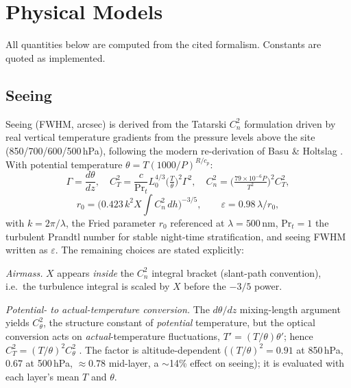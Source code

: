 \documentclass[11pt]{article}
\begin{document}
\section{Physical Models}

All quantities below are computed from the cited formalism. Constants are quoted
as implemented.

\subsection{Seeing}
\label{sec:seeing}
Seeing (FWHM, arcsec) is derived from the Tatarski $C_n^2$ formulation
\cite{tatarski} driven by real vertical temperature gradients from the pressure
levels above the site (850/700/600/500\,hPa), following the modern re-derivation of
Basu \& Holtslag \cite{basu}. With potential temperature $\theta = T(1000/P)^{R/c_p}$:
\[
\Gamma = \frac{d\theta}{dz},\quad
C_T^2 = \frac{c}{\mathrm{Pr}_t}L_0^{4/3}\Big(\tfrac{T}{\theta}\Big)^{2}\Gamma^2,\quad
C_n^2 = \Big(\tfrac{79\times10^{-6}P}{T^2}\Big)^{2}C_T^2,
\]
\[
r_0 = \big(0.423\,k^2 X\!\int\! C_n^2\,dh\big)^{-3/5},\qquad
\varepsilon = 0.98\,\lambda/r_0,
\]
with $k=2\pi/\lambda$, the Fried parameter $r_0$ \cite{fried} referenced at
$\lambda=500$\,nm, $\mathrm{Pr}_t=1$ the turbulent Prandtl number for stable
night-time stratification, and seeing FWHM written as $\varepsilon$. The remaining
choices are stated explicitly:

\emph{Airmass.} $X$ appears \emph{inside} the $C_n^2$ integral bracket (slant-path
convention), i.e.\ the turbulence integral is scaled by $X$ before the $-3/5$ power.

\emph{Potential- to actual-temperature conversion.} The $d\theta/dz$ mixing-length
argument yields $C_\theta^2$, the structure constant of \emph{potential}
temperature, but the optical conversion acts on \emph{actual}-temperature
fluctuations, $T' = (T/\theta)\theta'$; hence $C_T^2 = (T/\theta)^2 C_\theta^2$
\cite{basu}. The factor is altitude-dependent ($(T/\theta)^2 = 0.91$ at 850\,hPa,
$0.67$ at 500\,hPa, $\approx0.78$ mid-layer, a $\sim$14\% effect on seeing); it is
evaluated with each layer's mean $T$ and $\theta$.
\end{document}
